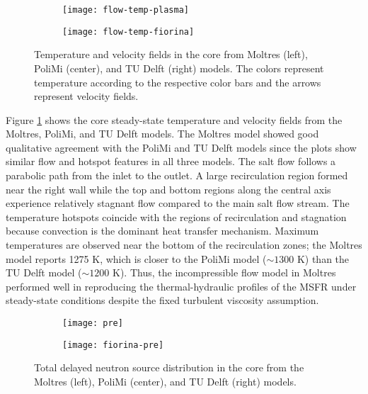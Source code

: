 \begin{figure}[htb!]
    \centering
    \begin{subfigure}[t]{.35\textwidth}
        \centering
        \texttt{[image: flow-temp-plasma]}
    \end{subfigure}
    \hfill
    \begin{subfigure}[t]{.625\textwidth}
        \centering
        \texttt{[image: flow-temp-fiorina]}
    \end{subfigure}
    \caption{Temperature and velocity fields in the core from Moltres
    (left), PoliMi (center), and TU Delft (right) models. The colors represent
    temperature according to the respective color bars and the arrows
    represent velocity fields. \cite{park_advancement_2020}}
    \label{fig:flow-temp}
\end{figure}

Figure \ref{fig:flow-temp} shows the core steady-state temperature and velocity
fields from the Moltres, PoliMi, and TU Delft models. The Moltres
model showed
good qualitative agreement with the PoliMi and TU Delft models since the plots
show similar flow and hotspot features in all three models. The salt flow
follows a parabolic path from the inlet to the outlet. A large
recirculation region formed near the right wall while the top and bottom
regions along the central axis experience relatively stagnant flow compared to
the main salt flow stream. The temperature hotspots coincide with the regions of
recirculation and stagnation because convection is the dominant heat transfer
mechanism. Maximum temperatures are observed near the bottom of the
recirculation zones; the Moltres model reports 1275 K, which is closer to the
PoliMi model ($\sim1300$ K) than the TU Delft model ($\sim1200$ K). Thus, the
incompressible flow model in Moltres performed well in reproducing the
thermal-hydraulic profiles of the \gls{MSFR} under steady-state conditions
despite the fixed turbulent viscosity assumption.

\begin{figure}[b!]
    \centering
    \begin{subfigure}[t]{.30\textwidth}
        \centering
        \vspace{.9cm}
        \texttt{[image: pre]}
    \end{subfigure}
    \begin{subfigure}[t]{.69\textwidth}
        \centering
        \vspace{0pt}
        \texttt{[image: fiorina-pre]}
    \end{subfigure}
    \caption{Total delayed neutron source distribution in the core from the
    Moltres (left), PoliMi (center), and TU Delft (right) models.}
    \label{fig:pre}
\end{figure}


